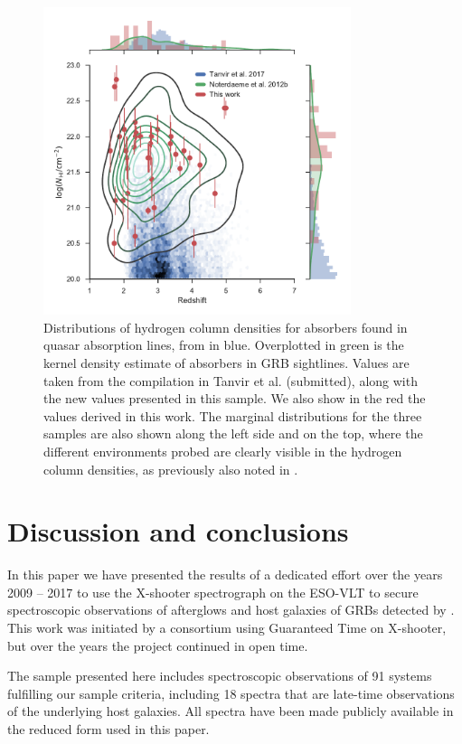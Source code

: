 \documentclass{aa}    %
\begin{document}
\begin{figure}[!ht]
	\centering \includegraphics[width=9cm]{figures/NH_dist.pdf}
\caption{Distributions of hydrogen column densities for absorbers found in
	quasar absorption lines, from \citet{Noterdaeme2012b} in blue. Overplotted in
	green is the kernel density estimate of absorbers in GRB sightlines. Values are
	taken from the compilation in Tanvir et al. (submitted), along with the new
	values presented in this sample. We also show in the red the values derived in
	this work. The marginal distributions for the three samples are also shown
	along the left side and on the top, where the different environments probed are
	clearly visible in the hydrogen column densities, as previously also noted in
	\citet{Fynbo2009}.} \label{fig:NH_dist}
\end{figure}



\section{Discussion and conclusions}\label{conclusions}

In this paper we have presented the results of a dedicated effort over the years
2009 -- 2017 to use the X-shooter spectrograph on the ESO-VLT to secure
spectroscopic observations of afterglows and host galaxies of GRBs detected by
\swift. This work was initiated by a consortium using Guaranteed Time on
X-shooter, but over the years the project continued in open time.

The sample presented here includes spectroscopic observations of 91 systems
fulfilling our sample criteria, including 18 spectra that are late-time
observations of the underlying host galaxies. All spectra have been made
publicly available in the reduced form used in this paper.
\end{document}
